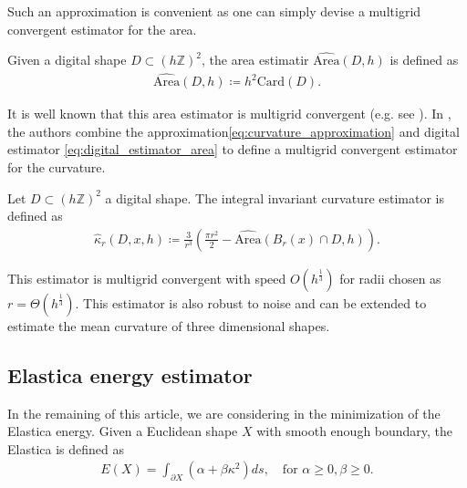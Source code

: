 \documentclass[smallextended]{svjour3}       %
\begin{document}
Such an approximation is convenient as one can simply devise a multigrid convergent estimator for the area.

\begin{definition}	
  Given a digital shape $D \subset (h \mathbb{Z})^2$,  the area estimatir $\widehat{\text{Area}}(D,h)$ is defined as	
  \begin{align}
    \widehat{\text{Area}}(D,h) \coloneqq h^2\text{Card}\left( D \right).	
    \label{eq:digital_estimator_area}
  \end{align}
\end{definition}
It is well known that this area estimator is multigrid convergent
(e.g. see \cite{klette2000multigrid}).  In
\cite{coeurjolly13integral}, the authors combine the
approximation\eqref{eq:curvature_approximation} and digital estimator
\eqref{eq:digital_estimator_area} to define a multigrid convergent
estimator for the curvature.

\begin{definition}
  Let $D \subset (h \mathbb{Z})^2$ a digital shape. The integral invariant curvature estimator is defined as
  \begin{align*}
    \hat{\kappa}_{r}(D,x,h) \coloneqq \frac{3}{r^3} \left( \frac{\pi r^2}{2} - \widehat{\text{Area}} \left( B_{r} ( x ) \cap D, h \right) \right).
  \end{align*}
\end{definition}

This estimator is multigrid convergent with speed $O(h^\frac{1}{3})$
for radii chosen as $r=\Theta(h^\frac{1}{3})$.  This estimator is also
robust to noise and can be extended to estimate the mean curvature of
three dimensional shapes.

\subsection{Elastica energy estimator}

In the remaining of this article, we are considering in the minimization of the Elastica energy. Given a Euclidean shape $X$ with smooth enough boundary, the Elastica is defined as
\begin{align}
  E(X) = \int_{\partial X}{(\alpha + \beta \kappa^2) ds}, \quad \text{for~} \alpha \ge 0, \beta \ge 0.
  \label{eq:elastica}
\end{align}
\end{document}
